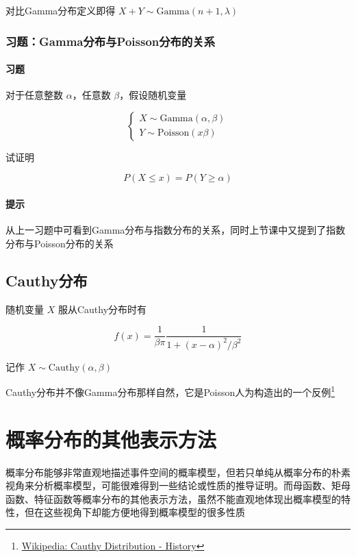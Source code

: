 \documentclass[a4paper, 11pt]{article} %
\begin{document}
对比Gamma分布定义即得 $X+Y\sim \text{Gamma}(n+1,\lambda)$

\subsubsection{习题：Gamma分布与Poisson分布的关系}

\paragraph{习题} 

对于任意整数 $\alpha$，任意数 $\beta$，假设随机变量

\begin{equation*}
\begin{cases}
	X\sim\text{Gamma}(\alpha,\beta) \\
	Y\sim\text{Poisson}(x\beta)
\end{cases}
\end{equation*}

试证明 

$$
P(X\le x)=P(Y\ge \alpha)
$$

\paragraph{提示} 从上一习题中可看到Gamma分布与指数分布的关系，同时上节课中又提到了指数分布与Poisson分布的关系

\subsection{Cauthy分布}

随机变量 $X$ 服从Cauthy分布时有

\begin{equation*}
f(x)=\frac{1}{\beta\pi}\frac{1}{1+(x-\alpha)^2/\beta^2}
\end{equation*}

记作 $X\sim\text{Cauthy}(\alpha,\beta)$

Cauthy分布并不像Gamma分布那样自然，它是Poisson人为构造出的一个反例\footnote{\href{https://en.wikipedia.org/wiki/Cauchy_distribution}{Wikipedia: Cauthy Distribution - History}}

\section{概率分布的其他表示方法}

概率分布能够非常直观地描述事件空间的概率模型，但若只单纯从概率分布的朴素视角来分析概率模型，可能很难得到一些结论或性质的推导证明。而母函数、矩母函数、特征函数等概率分布的其他表示方法，虽然不能直观地体现出概率模型的特性，但在这些视角下却能方便地得到概率模型的很多性质
\end{document}
